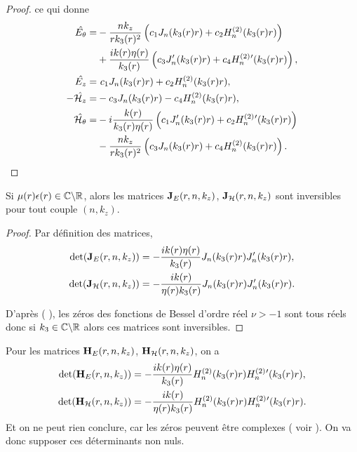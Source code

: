 \begin{proof}
      ce qui donne
       \begin{align*}
        \hat{E_\theta} =& -\dfrac{nk_z}{rk_3(r)^2}\left(c_1J_n(k_3(r)r) + c_2 H_n^{(2)}(k_3(r)r)\right) 
        \\
        & + \dfrac{ik(r)\eta(r)}{k_3(r)}\left(c_3J_n'(k_3(r)r) + c_4 H_n^{(2)}{}'(k_3(r)r)\right),
        \\
        \hat{E_z} =&{~} c_1 J_n(k_3(r) r) + c_2 H_n^{(2)}(k_3(r) r),
        \\
        -\hat{\mathcal{H}_z} =& -c_3 J_n(k_3(r) r) - c_4 H_n^{(2)}(k_3(r) r),
        \\
        \hat{\mathcal{H}_\theta} =& -{i\dfrac{k(r)}{k_3(r)\eta(r)}}\left(c_1J_n'(k_3(r)r) + c_2 H_n^{(2)}{}'(k_3(r)r)\right) 
        \\
        &- \dfrac{nk_z}{rk_3(r)^2}\left(c_3J_n(k_3(r)r) + c_4 H_n^{(2)}(k_3(r)r)\right).
      \end{align*}
    \end{proof}

    \begin{prop}
      \label{lem:cylindre:imp:inv_matrices_JE-HE}
      Si \(\mu(r)\epsilon(r) \in \mathbb C\backslash\mathbb R\), alors les matrices \(\mathbf{J}_E(r,n,k_z)\), \(\mathbf{J}_{\mathcal{H}}(r,n,k_z)\)  sont inversibles pour tout couple \((n,k_z)\).
    \end{prop}

    \begin{proof}
      Par définition des matrices,
      \begin{align*}
        \det(\mathbf{J}_E(r,n,k_z)) &= -\dfrac{ik(r)\eta(r)}{k_3(r)}J_n(k_3(r)r)J_n'(k_3(r)r),
        \\
        \det(\mathbf{J}_{\mathcal{H}}(r,n,k_z)) &= -\dfrac{ik(r)}{\eta(r)k_3(r)}J_n(k_3(r)r)J_n'(k_3(r)r).
      \end{align*}

      D’après \cite[p.~370]{abramowitz_handbook_1964} ( \cite[\url{https://dlmf.nist.gov/10.21\#i}]{dlmf_nist_2019} ), les zéros des fonctions de Bessel d'ordre réel \(\nu >-1\) sont tous réels donc si \(k_3 \in\mathbb C\backslash\mathbb R\) alors ces matrices sont inversibles.
    \end{proof}


    Pour les matrices \(\mathbf{H}_E(r,n,k_z)\), \(\mathbf{H}_{\mathcal{H}}(r,n,k_z)\), on a
    \begin{align*}
      \det(\mathbf{H}_E(r,n,k_z)) &= -\dfrac{ik(r)\eta(r)}{k_3(r)}H_n^{(2)}(k_3(r)r)H_n^{(2)}{}'(k_3(r)r),
      \\
      \det(\mathbf{H}_{\mathcal{H}}(r,n,k_z)) &= -\dfrac{ik(r)}{\eta(r)k_3(r)}H_n^{(2)}(k_3(r)r)H_n^{(2)}{}'(k_3(r)r).
     \end{align*}
    Et on ne peut rien conclure, car les zéros peuvent être complexes ( voir \cite{sandstrom_note_2007} ). On va donc supposer ces déterminants non nuls.


